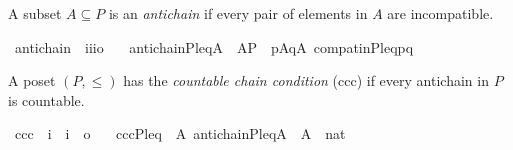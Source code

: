 A subset $A \subseteq P$ is an \emph{antichain} if every pair of
elements in $A$ are incompatible.
\begin{isabelle}
\isamarkupfalse%
\ antichain\ {\isacharcolon}{\isacharcolon}\ {\isachardoublequoteopen}i{\isasymRightarrow}i{\isasymRightarrow}i{\isasymRightarrow}o{\isachardoublequoteclose}\ \isanewline
\ \ {\isachardoublequoteopen}antichain{\isacharparenleft}P{\isacharcomma}leq{\isacharcomma}A{\isacharparenright}\ {\isacharequal}{\isacharequal}\ A{\isasymsubseteq}P\ {\isasymand}\ {\isacharparenleft}{\isasymforall}p{\isasymin}A{\isachardot}{\isasymforall}q{\isasymin}A{\isachardot}{\isacharparenleft}{\isasymnot}\ compat{\isacharunderscore}in{\isacharparenleft}P{\isacharcomma}leq{\isacharcomma}p{\isacharcomma}q{\isacharparenright}{\isacharparenright}{\isacharparenright}{\isachardoublequoteclose}
\end{isabelle}

A poset $(P,\leqslant)$ has the \emph{countable chain condition} (ccc)
if every antichain in $P$ is countable.
\begin{isabelle}
  \isamarkupfalse%
  \ ccc\ {\isacharcolon}{\isacharcolon}\ {\isachardoublequoteopen}i\ {\isasymRightarrow}\ i\ {\isasymRightarrow}\ o{\isachardoublequoteclose}\ \isanewline
\ \ {\isachardoublequoteopen}ccc{\isacharparenleft}P{\isacharcomma}leq{\isacharparenright}\ {\isacharequal}{\isacharequal}\ {\isasymforall}A{\isachardot}\ antichain{\isacharparenleft}P{\isacharcomma}leq{\isacharcomma}A{\isacharparenright}\ {\isasymlongrightarrow}\ {\isacharbar}A{\isacharbar}\ {\isasymle}\ nat{\isachardoublequoteclose}
\end{isabelle}

